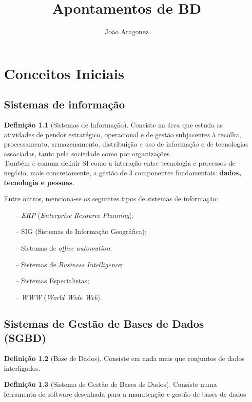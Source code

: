 \documentclass[oneside]{book}
\title{Apontamentos de BD}
\author{João Aragonez}
\date{}
\theoremstyle{definition}
\newtheorem{definition}{Definição}
\begin{document}
\maketitle
\tableofcontents

\chapter{Conceitos Iniciais}

\section{Sistemas de informação}
\begin{definition}[Sistemas de Informação]
    Consiste na área que estuda as atividades de pendor estratégico, operacional e de gestão subjacentes à recolha, processamento, armazenamento, distribuição e uso de informação e de tecnologias associadas, tanto pela sociedade como por organizações. \\
    \indent Também é comum definir SI como a interação entre tecnologia e processos de negócio, mais concretamente, a gestão de 3 componentes fundamentais: \textbf{dados, tecnologia e pessoas}.
\end{definition}
Entre outros, menciona-se os seguintes tipos de sistemas de informação:
\begin{itemize}
    \itemsep0cm
    \item[--] \textit{ERP} (\textit{Enterprise Resource Planning});
    \item[--] SIG (Sistemas de Informação Geográfica);
    \item[--] Sistemas de \textit{office automation};
    \item[--] Sistemas de \textit{Business Intelligence};
    \item[--] Sistemas Especialistas;
    \item[--] \textit{WWW} (\textit{World Wide Web}).   
\end{itemize}

\section{Sistemas de Gestão de Bases de Dados (SGBD)}

\begin{definition}[Base de Dados]
    Consiste em nada mais que conjuntos de dados interligados.
\end{definition}

\begin{definition}[Sistema de Gestão de Bases de Dados]
    Consiste numa ferramenta de software desenhada para a manutenção e gestão de bases de dados
\end{definition}
\end{document}
